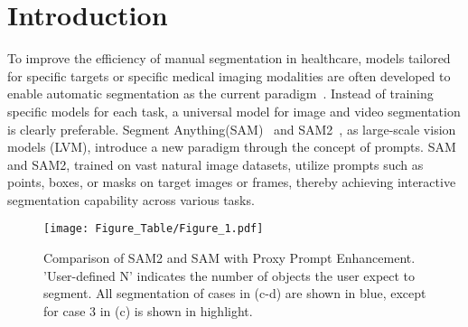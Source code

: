 \section{Introduction}
\label{sec:intro}

To improve the efficiency of manual segmentation in healthcare, models tailored for specific targets or specific medical imaging modalities are often developed to enable automatic segmentation as the current paradigm~\cite{rayed2024deep}. Instead of training specific models for each task, a universal model for image and video segmentation is clearly preferable. Segment Anything(SAM)~\cite{kirillov2023segment} and SAM2~\cite{ravi2024sam}, as large-scale vision models (LVM), introduce a new paradigm through the concept of prompts. SAM and SAM2, trained on vast natural image datasets, utilize prompts such as points, boxes, or masks on target images or frames, thereby achieving interactive segmentation capability across various tasks.

\begin{figure}[t]
  \centering
   \texttt{[image: Figure\_Table/Figure\_1.pdf]}
   \caption{Comparison of SAM2 and SAM with Proxy Prompt Enhancement. 'User-defined N' indicates the number of objects the user expect to segment. All segmentation of cases in (c-d) are shown in blue, except for case 3 in (c) is shown in highlight.
   }
   \label{fig:Figure1}
\end{figure}


